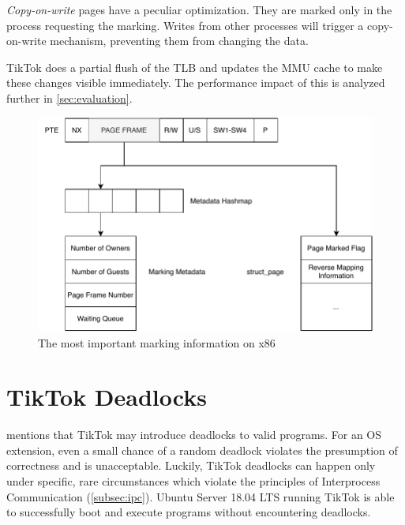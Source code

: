 \emph{Copy-on-write} pages have a peculiar optimization. They are marked only in
the process requesting the marking. Writes from other processes will trigger a
copy-on-write mechanism, preventing them from changing the data.

TikTok does a partial flush of the TLB and updates the MMU cache to make these
changes visible immediately. The performance impact of this is analyzed further
in \cref{sec:evaluation}.

\begin{figure}[]
  \centering
  \includegraphics[width=\linewidth]{img/book-keeping.pdf}
  \caption{The most important marking information on x86}
  \label{fig:bookkeeping}
\end{figure}

\section{TikTok Deadlocks}
\label{sec:deadlocks}

 mentions that TikTok may introduce deadlocks to valid
programs. For an OS extension, even a small chance of a random deadlock violates
the presumption of correctness and is unacceptable. Luckily, TikTok deadlocks
can happen only under specific, rare circumstances which violate the principles
of Interprocess Communication (\cref{subsec:ipc}). Ubuntu Server 18.04 LTS
running TikTok is able to successfully boot and execute programs without
encountering deadlocks.


